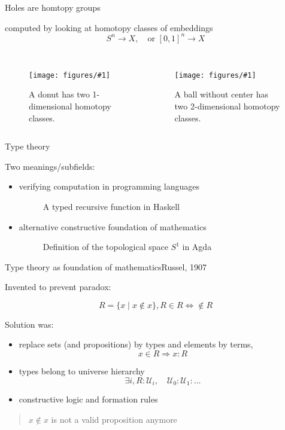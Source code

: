 \documentclass[english,draft]{beamer}
\newcommand{\fig}[2]{
    \begin{figure}\begin{center}\texttt{[image: figures/\#1]}\caption{#2\label{#1}}\end{center}
    \end{figure}}
\newcommand{\tcol}[2]{
    \begin{columns}
        \column{.5\textwidth}
        #1
        \column{.5\textwidth}
        #2
    \end{columns}
}
\begin{document}
\begin{frame}{Holes are homtopy groups}

computed by looking at homotopy classes of embeddings $$S^n \rightarrow X, \quad \text{or } [0,1]^n \rightarrow X$$

\tcol{
                \fig{loops}{A donut has two 1-dimensional homotopy classes.}
}
    {
                \fig{basketball_hollow}{A ball without center has two 2-dimensional homotopy classes.}
}
\end{frame}


\begin{frame}{Type theory}
    
    Two meanings/subfields:
    \begin{itemize}
        \item verifying computation in programming languages
        \begin{figure}
            
            \caption{A typed recursive function in Haskell}
        \end{figure}
    
        \pause
        \item alternative constructive foundation of mathematics
        \begin{figure}
            
            \caption{Definition of the topological space $S^1$ in Agda}
        \end{figure}
    
    \end{itemize}

    
\end{frame}

\begin{frame}{Type theory as foundation of mathematics}{Russel, 1907}

Invented to prevent paradox:


    $$ R = \{x \mid x \not \in x \}, R\in R \Leftrightarrow \not \in R $$
    

Solution was:
\begin{itemize}
\item replace sets (and propositions) by types and elements by terms, $$x \in R \Rightarrow x : R$$
\item types belong to universe hierarchy 
        \[\exists i, R : \mathcal{U}_i, \quad \mathcal{U}_0 : \mathcal{U}_1 : \ldots \]
\item constructive logic and formation rules
\end{itemize}

\begin{quotation}
$x \not \in x$ is not a valid proposition anymore
\end{quotation}

\end{frame}
\end{document}

